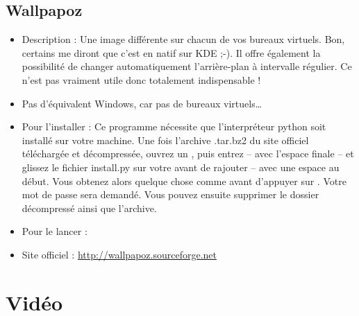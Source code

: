 \subsection{Wallpapoz}
\begin{itemize}
\begingroup
{}
\item Description : Une image différente sur chacun de vos bureaux virtuels. Bon, certains me diront que c'est en natif sur KDE ;-). Il offre également la possibilité de changer automatiquement l'arrière-plan à intervalle régulier. Ce n'est pas vraiment utile donc totalement indispensable !{\par}
\endgroup
\item Pas d'équivalent Windows, car pas de bureaux virtuels\ldots{}{\par}
\item Pour l'installer : Ce programme nécessite que l'interpréteur python soit installé sur votre machine. Une fois l'archive .tar.bz2 du site officiel téléchargée et décompressée, ouvrez un , puis entrez  -- avec l'espace finale -- et glissez le fichier install.py sur votre  avant de rajouter  -- avec une espace au début. Vous obtenez alors quelque chose comme  avant d'appuyer sur . Votre mot de passe sera demandé. Vous pouvez ensuite supprimer le dossier décompressé ainsi que l'archive.{\par}
\item Pour le lancer : 
\item Site officiel : \url{http://wallpapoz.sourceforge.net}{\par}
\end{itemize}
\newpage
\section{Vidéo}
